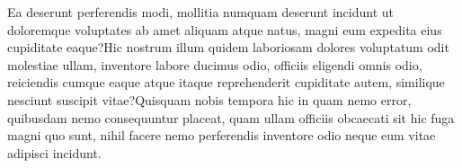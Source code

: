 \documentclass[letterpaper]{article}
\begin{document}
%
%


Ea deserunt perferendis modi, mollitia numquam deserunt incidunt ut doloremque voluptates ab amet aliquam atque natus, magni eum expedita eius cupiditate eaque?Hic nostrum illum quidem laboriosam dolores voluptatum odit molestiae ullam, inventore labore ducimus odio, officiis eligendi omnis odio, reiciendis cumque eaque atque itaque reprehenderit cupiditate autem, similique nesciunt suscipit vitae?Quisquam nobis tempora hic in quam nemo error, quibusdam nemo consequuntur placeat, quam ullam officiis obcaecati sit hic fuga magni quo sunt, nihil facere nemo perferendis inventore odio neque eum vitae adipisci incidunt.\clearpage

\end{document}
